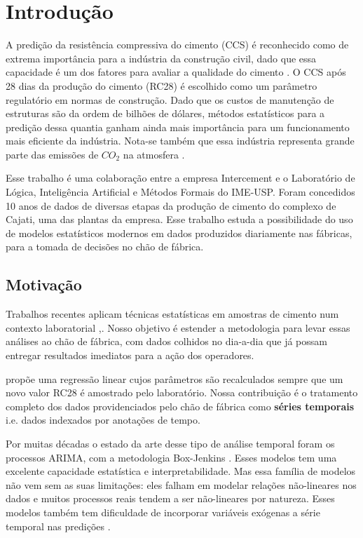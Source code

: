 \chapter{Introdução}
\label{cap:introducao}


A predição da resistência compressiva do cimento (CCS) é reconhecido como de
extrema importância para a indústria da construção civil, dado que essa
capacidade é um dos fatores para avaliar a qualidade do cimento
\citep{cementml}. O CCS após 28 dias da produção do cimento (RC28) é escolhido
 como um parâmetro regulatório em normas de construção. Dado que os custos de
 manutenção de estruturas são da ordem de bilhões de dólares, métodos
 estatísticos para a predição dessa quantia ganham ainda mais importância para um
 funcionamento mais eficiente da indústria. Nota-se também que essa  
 indústria representa grande parte das emissões de $CO_2$ na atmosfera \cite{cementroadmap}.

Esse trabalho é uma colaboração entre a empresa Intercement e o Laboratório de
Lógica, Inteligência Artificial e Métodos Formais do IME-USP. Foram concedidos
10 anos de dados de diversas etapas da produção de cimento do complexo de
Cajati, uma das plantas da empresa. Esse trabalho estuda a possibilidade do uso
de modelos estatísticos modernos em dados produzidos diariamente nas fábricas,
para a tomada de decisões no chão de fábrica.


\section {Motivação}



Trabalhos recentes aplicam técnicas estatísticas em amostras de cimento num
contexto laboratorial \citep{cementlin},\citep{nncement}.
Nosso objetivo é estender a metodologia para
levar essas análises ao chão de fábrica, com dados colhidos no dia-a-dia que já
possam entregar resultados imediatos para a ação dos operadores.

\cite{dynstat} propõe uma regressão linear cujos parâmetros são recalculados
sempre que um novo valor RC28 é amostrado pelo laboratório. Nossa contribuição é
o tratamento completo dos dados providenciados pelo chão de fábrica como
\textbf{séries temporais} i.e. dados indexados por anotações de tempo.

Por muitas décadas o estado da arte desse tipo de análise temporal foram os
processos ARIMA, com a metodologia Box-Jenkins \citep{arima}.
Esses modelos tem uma excelente capacidade estatística e interpretabilidade.
Mas essa família de modelos não vem sem as suas limitações:
eles falham em modelar relações não-lineares nos dados \citep{forecasting} e 
muitos processos reais tendem a ser não-lineares por natureza.
Esses modelos também tem dificuldade de incorporar variáveis exógenas a série temporal nas predições \cite{ubertime}.


